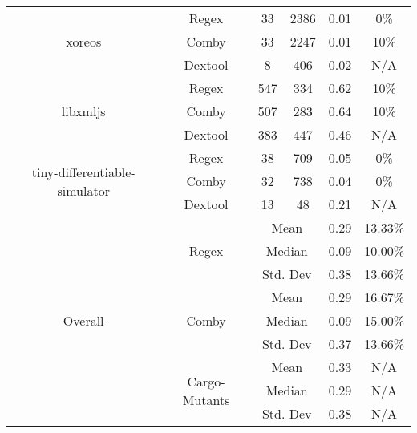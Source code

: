\documentclass[sigconf,review, anonymous]{acmart}
\begin{document}
{\begin{table}[htbp]
{\begin{tabular}{|c|c|c|c|c|c|}
\multirow{3}{*}{\small xoreos} & Regex & 33 & 2386 & 0.01 & 0\% \\\cline{2-6}
    & Comby & 33 & 2247 & 0.01 & 10\% \\ \cline{2-6}
    & Dextool & 8 & 406 & 0.02 & N/A \\ \hline
\multirow{3}{*}{\small libxmljs} & Regex & 547 & 334 & 0.62 & 10\% \\\cline{2-6}
    & Comby & 507 & 283 & 0.64 & 10\% \\ \cline{2-6}
    & Dextool & 383 & 447 & 0.46 & N/A \\ \hline
\multirow{3}{*}{\small tiny-differentiable-simulator} & Regex & 38 & 709 & 0.05 & 0\% \\\cline{2-6}
    & Comby & 32 & 738 & 0.04 & 0\% \\ \cline{2-6}
    & Dextool & 13 & 48 & 0.21 & N/A\\ \hline
    
\multirow{9}{*}{Overall} & \multirow{3}{*}{Regex} & \multicolumn{2}{c|}{Mean} & 0.29  & 13.33\%\\\cline{3-6}
    &   &  \multicolumn{2}{c|}{Median} & 0.09 & 10.00\% \\\cline{3-6}
    &   &  \multicolumn{2}{c|}{Std. Dev} & 0.38 & 13.66\% \\\cline{2-6}

 & \multirow{3}{*}{Comby} & \multicolumn{2}{c|}{Mean} & 0.29 & 16.67\% \\\cline{3-6}
    &   &  \multicolumn{2}{c|}{Median} & 0.09 & 15.00\% \\\cline{3-6}
    &   &  \multicolumn{2}{c|}{Std. Dev} & 0.37 & 13.66\% \\\cline{2-6}

 & \multirow{3}{*}{Cargo-Mutants} & \multicolumn{2}{c|}{Mean} & 0.33 & N/A\\\cline{3-6}
    &   &  \multicolumn{2}{c|}{Median} & 0.29 & N/A \\\cline{3-6}
    &   &  \multicolumn{2}{c|}{Std. Dev} & 0.38 & N/A \\ \hline
    
    
\end{tabular}
}
\end{table}


\begin{table}[htbp]
\centering
\caption{Java (UniversalMutator vs. PIT vs. LittleDarwin)}
\label{tab:table_java2}
\end{table}}
\end{document}
